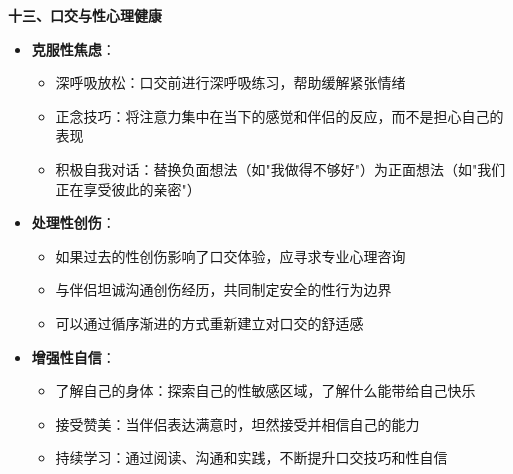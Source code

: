 \documentclass[12pt,UTF8]{ctexbook}
\begin{document}
  \textbf{十三、口交与性心理健康}
  \begin{itemize}
  \item \textbf{克服性焦虑}：
    \begin{itemize}
    \item 深呼吸放松：口交前进行深呼吸练习，帮助缓解紧张情绪
    \item 正念技巧：将注意力集中在当下的感觉和伴侣的反应，而不是担心自己的表现
    \item 积极自我对话：替换负面想法（如"我做得不够好"）为正面想法（如"我们正在享受彼此的亲密"）
    \end{itemize}
  \item \textbf{处理性创伤}：
    \begin{itemize}
    \item 如果过去的性创伤影响了口交体验，应寻求专业心理咨询
    \item 与伴侣坦诚沟通创伤经历，共同制定安全的性行为边界
    \item 可以通过循序渐进的方式重新建立对口交的舒适感
    \end{itemize}
  \item \textbf{增强性自信}：
    \begin{itemize}
    \item 了解自己的身体：探索自己的性敏感区域，了解什么能带给自己快乐
    \item 接受赞美：当伴侣表达满意时，坦然接受并相信自己的能力
    \item 持续学习：通过阅读、沟通和实践，不断提升口交技巧和性自信
    \end{itemize}
  \end{itemize}
\end{document}
